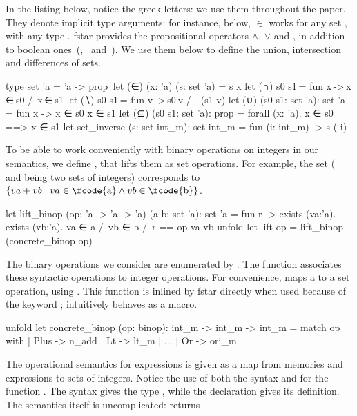 \documentclass{llncs}
\begin{document}
In the listing below, notice the greek letters: we use them
throughout the paper.
%
They denote implicit type arguments: for instance, below, $\in$
works for any set , with any type .
%
\gls{fstar} provides the propositional operators $\wedge$, $\vee$
and \fcode{==}, in addition to boolean
ones~(\fcode{&&},~\fcode{||} and~\fcode{=}).
%
We use them below to define the union, intersection and
differences of sets.
%
\begin{fstarcode}
type set 'a = 'a -> prop             let (∈) (x: 'a) (s: set 'a) = s x
let (∩) s0 s1 = fun x -> x ∈ s0 /\ x ∈ s1  let (∖) s0 s1 = fun v -> s0 v /\ ~(s1 v)
let (∪) (s0 s1: set 'a): set 'a = fun x -> x ∈ s0 \/ x ∈ s1
let (⊆) (s0 s1: set 'a): prop = forall (x: 'a). x ∈ s0 ==> x ∈ s1
let set_inverse (s: set int_m): set int_m = fun (i: int_m) -> s (-i)
\end{fstarcode}
%
To be able to work conveniently with binary operations on integers
in our semantics, we define , that lifts them as
set operations.
%
For example, the set  ( and
 being two sets of integers) corresponds to
%
$\left\{
va + vb \mid va\in \textrm{\fcode{a}} \wedge vb \in \textrm{\fcode{b}}
\right\}$.
%
\begin{fstarcode}
let lift_binop (op: 'a -> 'a -> 'a) (a b: set 'a): set 'a
  = fun r -> exists (va:'a). exists (vb:'a). va ∈ a /\ vb ∈ b /\ r == op va vb
unfold let lift op = lift_binop (concrete_binop op)
\end{fstarcode}
%
The binary operations we consider are enumerated by
. The function  associates these syntactic operations to integer operations.
%
For convenience,  maps a  to a set
operation, using . This function is inlined by
\gls{fstar} directly when used because of the keyword
; intuitively  behaves as a macro.
%
\begin{fstarcode}
unfold let concrete_binop (op: binop): int_m -> int_m -> int_m
  = match op with | Plus -> n_add | Lt -> lt_m | ... | Or -> ori_m
\end{fstarcode}
%
The operational semantics for expressions is given as a map from
memories and expressions to sets of integers.
%
Notice the use of both the syntax  and  for
the function .
%
The  syntax gives  the type
, while the  declaration
gives its definition.
%
The semantics itself is uncomplicated:  returns
\end{document}
